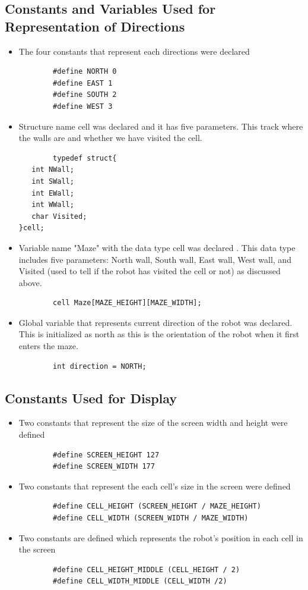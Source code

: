 \documentclass[11pt]{article}
\begin{document}

\subsection{Constants and Variables Used for Representation of Directions}
\begin{itemize}
\item The four constants that represent each directions were declared 
	\begin{verbatim}
		#define NORTH 0
		#define EAST 1
		#define SOUTH 2
		#define WEST 3
	\end{verbatim}
\item Structure name cell was declared and it has five parameters. This track where the walls are and whether we have visited the cell.
	\begin{verbatim}
		typedef struct{
   int NWall; 
   int SWall; 
   int EWall; 
   int WWall; 
   char Visited;
}cell;\end{verbatim}
\item Variable name "Maze" with the data type cell was declared . This data type includes five parameters: North wall, South wall, East wall, West wall, and Visited (used to tell if the robot has visited the cell or not) as discussed above.
	\begin{verbatim}
		cell Maze[MAZE_HEIGHT][MAZE_WIDTH];
	\end{verbatim}
\item Global variable that represents current direction of the robot was declared. This is initialized as north as this is the orientation of the robot when it first enters the maze.
	\begin{verbatim}
		int direction = NORTH;
	\end{verbatim}
\end{itemize}


\subsection{Constants Used for Display}
\begin{itemize}
\item Two constants that represent the size of the screen width and height were defined
	\begin{verbatim}
		#define SCREEN_HEIGHT 127
		#define SCREEN_WIDTH 177 
	\end{verbatim} 
\item Two constants that represent the each cell's size in the screen were defined
	\begin{verbatim}
		#define CELL_HEIGHT (SCREEN_HEIGHT / MAZE_HEIGHT)
		#define CELL_WIDTH (SCREEN_WIDTH / MAZE_WIDTH)
	\end{verbatim} 
\item Two constants are defined which represents the robot's position in each cell in the screen
	\begin{verbatim}
		#define CELL_HEIGHT_MIDDLE (CELL_HEIGHT / 2)
		#define CELL_WIDTH_MIDDLE (CELL_WIDTH /2)
	\end{verbatim}
\end{itemize}
\end{document}
